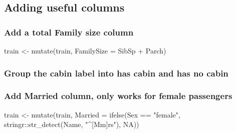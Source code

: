 \documentclass[
]{article}
\newenvironment{Shaded}{\begin{snugshade}}{\end{snugshade}}
\newcommand{\AttributeTok}[1]{\textcolor[rgb]{0.77,0.63,0.00}{#1}}
\newcommand{\ConstantTok}[1]{\textcolor[rgb]{0.00,0.00,0.00}{#1}}
\newcommand{\FunctionTok}[1]{\textcolor[rgb]{0.00,0.00,0.00}{#1}}
\newcommand{\NormalTok}[1]{#1}
\newcommand{\OtherTok}[1]{\textcolor[rgb]{0.56,0.35,0.01}{#1}}
\newcommand{\SpecialCharTok}[1]{\textcolor[rgb]{0.00,0.00,0.00}{#1}}
\newcommand{\StringTok}[1]{\textcolor[rgb]{0.31,0.60,0.02}{#1}}
\begin{document}
\hypertarget{adding-useful-columns}{%
\subsection{Adding useful columns}\label{adding-useful-columns}}

\hypertarget{add-a-total-family-size-column}{%
\subsubsection{Add a total Family size
column}\label{add-a-total-family-size-column}}

\begin{Shaded}
\begin{Highlighting}[]
\NormalTok{train }\OtherTok{\textless{}{-}} \FunctionTok{mutate}\NormalTok{(train, }\AttributeTok{FamilySize =}\NormalTok{ SibSp }\SpecialCharTok{+}\NormalTok{ Parch)}
\end{Highlighting}
\end{Shaded}

\hypertarget{group-the-cabin-label-into-has-cabin-and-has-no-cabin}{%
\subsubsection{Group the cabin label into has cabin and has no
cabin}\label{group-the-cabin-label-into-has-cabin-and-has-no-cabin}}

\begin{Shaded}
\end{Shaded}

\hypertarget{add-married-column-only-works-for-female-passengers}{%
\subsubsection{Add Married column, only works for female
passengers}\label{add-married-column-only-works-for-female-passengers}}

\begin{Shaded}
\begin{Highlighting}[]
\NormalTok{train }\OtherTok{\textless{}{-}} \FunctionTok{mutate}\NormalTok{(train,}
                \AttributeTok{Married =} \FunctionTok{ifelse}\NormalTok{(Sex }\SpecialCharTok{==} \StringTok{"female"}\NormalTok{,}
\NormalTok{                                 stringr}\SpecialCharTok{::}\FunctionTok{str\_detect}\NormalTok{(Name, }\StringTok{"\^{}[Mm]rs"}\NormalTok{), }\ConstantTok{NA}\NormalTok{))}
\end{Highlighting}
\end{Shaded}
\end{document}

